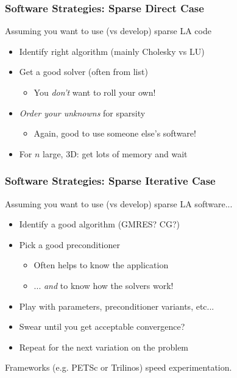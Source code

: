 \documentclass{beamer}
\begin{document}
\begin{frame}
  \frametitle{Software Strategies: Sparse Direct Case}

  Assuming you want to use (vs develop) sparse LA code
  \begin{itemize}
  \item Identify right algorithm (mainly Cholesky vs LU)
  \item Get a good solver (often from list)
    \begin{itemize}
    \item You {\em don't} want to roll your own!
    \end{itemize}
  \item {\em Order your unknowns} for sparsity
    \begin{itemize}
    \item Again, good to use someone else's software!
    \end{itemize}
  \item For $n$ large, 3D: get lots of memory and wait
  \end{itemize}

\end{frame}


\begin{frame}
  \frametitle{Software Strategies: Sparse Iterative Case}

  Assuming you want to use (vs develop) sparse LA software...
  \begin{itemize}
  \item Identify a good algorithm (GMRES? CG?)
  \item Pick a good preconditioner
    \begin{itemize}
    \item Often helps to know the application
    \item ... {\em and} to know how the solvers work!
    \end{itemize}
  \item Play with parameters, preconditioner variants, etc...
  \item Swear until you get acceptable convergence?
  \item Repeat for the next variation on the problem
  \end{itemize}

  \vspace{5mm}
  Frameworks (e.g. PETSc or Trilinos) speed experimentation.

\end{frame}
\end{document}

